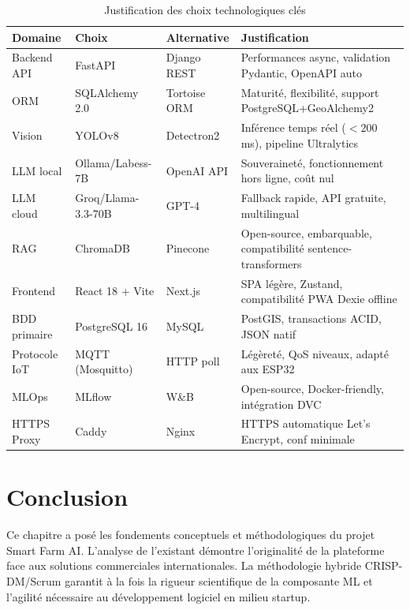 \begin{table}[H]
\centering
\caption{Justification des choix technologiques clés}
\label{tab:choix_tech}
\begin{tabularx}{\linewidth}{lllX}
\toprule
\textbf{Domaine} & \textbf{Choix} & \textbf{Alternative} & \textbf{Justification} \\
\midrule
Backend API  & FastAPI  & Django REST & Performances async, validation Pydantic, OpenAPI auto \\
ORM          & SQLAlchemy 2.0 & Tortoise ORM & Maturité, flexibilité, support PostgreSQL+GeoAlchemy2 \\
Vision       & YOLOv8  & Detectron2  & Inférence temps réel ($<200$\,ms), pipeline Ultralytics \\
LLM local    & Ollama/Labess-7B & OpenAI API & Souveraineté, fonctionnement hors ligne, coût nul \\
LLM cloud    & Groq/Llama-3.3-70B & GPT-4 & Fallback rapide, API gratuite, multilingual \\
RAG          & ChromaDB & Pinecone    & Open-source, embarquable, compatibilité sentence-transformers \\
Frontend     & React 18 + Vite & Next.js & SPA légère, Zustand, compatibilité PWA Dexie offline \\
BDD primaire & PostgreSQL 16 & MySQL & PostGIS, transactions ACID, JSON natif \\
Protocole IoT& MQTT (Mosquitto) & HTTP poll & Légèreté, QoS niveaux, adapté aux ESP32 \\
MLOps        & MLflow  & W\&B        & Open-source, Docker-friendly, intégration DVC \\
HTTPS Proxy  & Caddy   & Nginx       & HTTPS automatique Let's Encrypt, conf minimale \\
\bottomrule
\end{tabularx}
\end{table}

\section*{Conclusion}
Ce chapitre a posé les fondements conceptuels et méthodologiques du projet
Smart Farm AI. L'analyse de l'existant démontre l'originalité de la plateforme
face aux solutions commerciales internationales. La méthodologie hybride
CRISP-DM/Scrum garantit à la fois la rigueur scientifique de la composante
ML et l'agilité nécessaire au développement logiciel en milieu startup.

